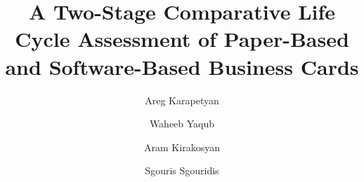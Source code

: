 \documentclass[3p,times,procedia]{elsarticle}
\begin{document}
\begin{frontmatter}




\title{A Two-Stage Comparative Life Cycle Assessment of Paper-Based and Software-Based Business Cards}



\author{Areg Karapetyan }
\author{Waheeb Yaqub }
\author{Aram Kirakosyan}
\author{Sgouris Sgouridis}

\address{Department of Electrical Engineering and Computer Science, Masdar Institute of Science and Technology, Abu Dhabi, UAE}




\end{frontmatter}
\end{document}
